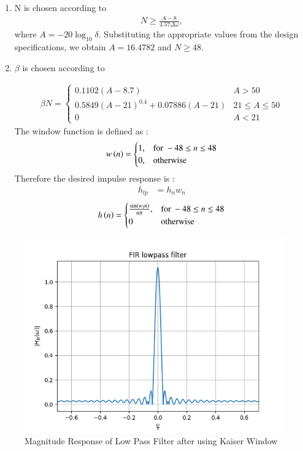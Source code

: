 \documentclass{article}
\begin{document}
\begin{enumerate}
\item  N is chosen according to
\begin{align}
    N \geq \frac{A-8}{4.57\Delta \omega},
\end{align}
where $A = -20\log_{10}\delta$.  Substituting the appropriate values from the design specifications, we obtain
$A = 16.4782$ and $N \geq 48$.


\item  $\beta$ is chosen according to

\begin{align}
    \beta N = \left\{ \begin{array}{ll} 0.1102(A-8.7) & A > 50 \\
0.5849(A-21)^{0.4}+ 0.07886(A-21) & 21 \leq A \leq 50 \\
0 & A < 21\end{array} \right.
\end{align}
The window function is defined as :
\begin{align}
    w\left(n\right) =
\begin{cases}
    1, & \text{for } -48\leq n \leq 48 \\
    0, & \text{otherwise }
\end{cases} \label{eq:w(n)_for_Kaiser}
\end{align}
Therefore the desired impulse response is :
\begin{align}
    h_{lp} &= h_{n}w_{n}
\end{align}
\begin{align}
    h\left(n\right) =
\begin{cases}
    \frac{\sin(w_l n)}{n\pi},  & \text{for } -48\leq n \leq 48 \\
    0 &\text{otherwise}
\end{cases} \label{eq:h(n)desired_for_LPF}
\end{align}
\end{enumerate}
\begin{figure}[h!]
\centering
\includegraphics[width=1\columnwidth]{figs/FIR_kaiser_lp.png}
\caption{Magnitude Response of Low Pass Filter after using Kaiser Window}
\label{fig:Kaiser_LPF_response}
\end{figure}
\end{document}

